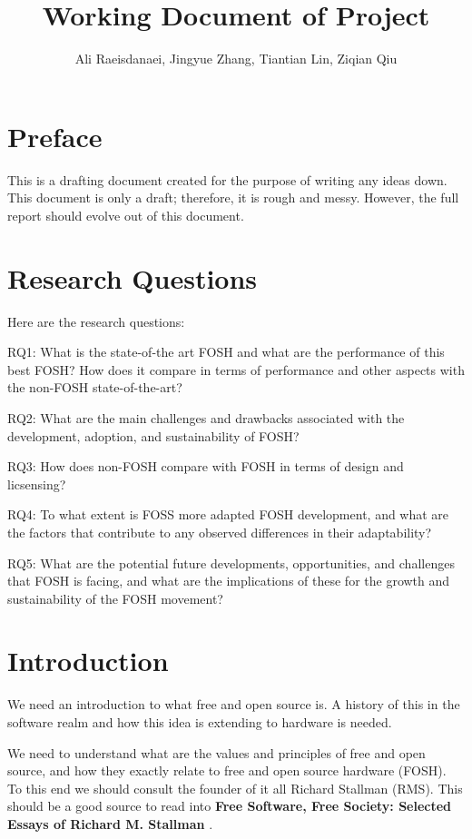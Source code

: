 \documentclass{article}
\begin{document}


\title{Working Document of Project}
\author{Ali Raeisdanaei, Jingyue Zhang, Tiantian Lin, Ziqian Qiu }
\date{}
\maketitle

\section{Preface}
This is a drafting document created for the purpose of writing any ideas down.
This document is only a draft; therefore, it is rough and messy.
However, the full report should evolve out of this document.

\section{Research Questions}
Here are the research questions:

RQ1: What is the state-of-the art FOSH and what are the performance of this best FOSH? How does it compare in terms of performance and other aspects with the non-FOSH state-of-the-art? 

RQ2: What are the main challenges and drawbacks associated with the development, adoption, and sustainability of FOSH?

RQ3: How does non-FOSH compare with FOSH in terms of design and licsensing?

RQ4: To what extent is FOSS more adapted FOSH development, and what are the factors that contribute to any observed differences in their adaptability?

RQ5: What are the potential future developments, opportunities, and challenges that FOSH is facing, and what are the implications of these for the growth and sustainability of the FOSH movement?

\section{Introduction}
We need an introduction to what free and open source is. 
A history of this in the software realm and how this idea is extending to hardware is needed. 

We need to understand what are the values and principles of free and open source, and how they exactly relate to free and open source hardware (FOSH).
To this end we should consult the founder of it all Richard Stallman (RMS).
This should be a good source to read into
\textbf{Free Software, Free Society: Selected Essays of Richard M. Stallman}
\cite{b0_stallman}.
\end{document}

